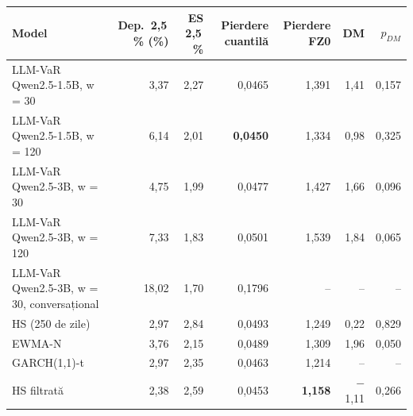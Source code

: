 \begin{tabular}{lrrrrrr}
\toprule
Model & Dep.\ 2,5\,\% (\%) & ES 2,5\,\% & Pierdere cuantilă & Pierdere FZ0 & DM & $p_{DM}$ \\
\midrule
LLM-VaR Qwen2.5-1.5B, w = 30 & 3,37 & 2,27 & 0,0465 & 1,391 & 1,41 & 0,157 \\
LLM-VaR Qwen2.5-1.5B, w = 120 & 6,14 & 2,01 & \textbf{0,0450} & 1,334 & 0,98 & 0,325 \\
LLM-VaR Qwen2.5-3B, w = 30 & 4,75 & 1,99 & 0,0477 & 1,427 & 1,66 & 0,096 \\
LLM-VaR Qwen2.5-3B, w = 120 & 7,33 & 1,83 & 0,0501 & 1,539 & 1,84 & 0,065 \\
LLM-VaR Qwen2.5-3B, w = 30, conversațional & 18,02 & 1,70 & 0,1796 & -- & -- & -- \\
HS (250 de zile) & 2,97 & 2,84 & 0,0493 & 1,249 & 0,22 & 0,829 \\
EWMA-N & 3,76 & 2,15 & 0,0489 & 1,309 & 1,96 & 0,050 \\
GARCH(1,1)-t & 2,97 & 2,35 & 0,0463 & 1,214 & -- & -- \\
HS filtrată & 2,38 & 2,59 & 0,0453 & \textbf{1,158} & $-$1,11 & 0,266 \\
\bottomrule
\end{tabular}
